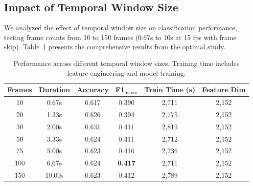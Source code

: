\subsection{Impact of Temporal Window Size}
\label{sec:temporal-window}

We analyzed the effect of temporal window size on classification performance, testing frame counts from 10 to 150 frames (0.67s to 10s at 15 fps with frame skip). Table~\ref{tab:frame-count-results} presents the comprehensive results from the optimal study.

\begin{table}[t]
\centering
\caption{Performance across different temporal window sizes. Training time includes feature engineering and model training.}
\label{tab:frame-count-results}
\begin{tabular}{cccccc}
\toprule
\textbf{Frames} & \textbf{Duration} & \textbf{Accuracy} & \textbf{F1$_{\text{macro}}$} & \textbf{Train Time (s)} & \textbf{Feature Dim} \\
\midrule
10 & 0.67s & 0.617 & 0.390 & 2,711 & 2,152 \\
20 & 1.33s & 0.626 & 0.394 & 2,775 & 2,152 \\
30 & 2.00s & 0.631 & 0.411 & 2,819 & 2,152 \\
50 & 3.33s & 0.624 & 0.411 & 2,712 & 2,152 \\
75 & 5.00s & 0.623 & 0.416 & 2,736 & 2,152 \\
100 & 6.67s & 0.624 & \textbf{0.417} & 2,711 & 2,152 \\
150 & 10.00s & 0.623 & 0.412 & 2,789 & 2,152 \\
\bottomrule
\end{tabular}
\end{table}

